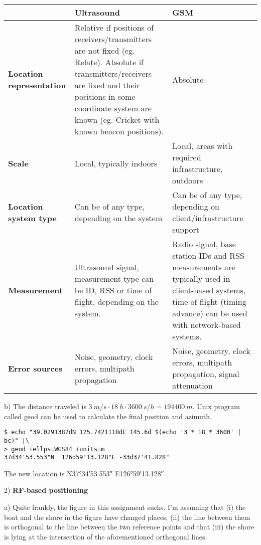 \documentclass[a4paper,parskip=full]{scrartcl}
\begin{document}
\begin{tabularx}{\textwidth}{ | >{\raggedright\arraybackslash}p{14ex} | >{\raggedright\arraybackslash}X | >{\raggedright\arraybackslash}X | }
  \hline
  & \textbf{Ultrasound} & \textbf{GSM} \\ \hline
  \textbf{Location representation} &
    Relative if positions of receivers/transmitters are not fixed (eg.
    Relate). Absolute if transmitters/receivers are fixed and their positions in
    some coordinate system are known (eg. Cricket with known beacon positions).
    &
    Absolute \\ \hline
  \textbf{Scale} & Local, typically indoors & Local, areas with required
    infrastructure, outdoors \\ \hline
  \textbf{Location system type} & Can be of any type, depending on the system
    & Can be of any type, depending on client/infrastructure support \\ \hline
  \textbf{Measurement} & Ultrasound signal, measurement type can be
    ID, RSS or time of flight, depending on the system. & Radio signal,
      base station IDs and RSS-measurements are typically used in
      client-based systems, time of flight (timing advance) can be used with
      network-based systems. \\ \hline
  \textbf{Error sources} & Noise, geometry, clock errors, multipath propagation
    & Noise, geometry, clock errors, multipath propagation, signal
      attenuation \\ \hline
\end{tabularx}

b) The distance traveled is $\SI{3}{m/s} \cdot \SI{18}{h} \cdot \SI{3600}{s/h}
= \SI{194400}{m}$. Unix program called geod can be used to calculate the
final position and azimuth.
\begin{verbatim}
$ echo "39.0291382dN 125.7421118dE 145.6d $(echo '3 * 18 * 3600' | bc)" |\
> geod +ellps=WGS84 +units=m
37d34'53.553"N  126d59'13.128"E -33d37'41.828"
\end{verbatim}
The new location is N\ang{37;34;53.553} E\ang{126;59;13.128}.

2) \textbf{RF-based positioning}

a) Quite frankly, the figure in this assignment sucks. I'm assuming that (i) the
boat and the shore in the figure have changed places, (ii) the line between them
is orthogonal to the line between the two reference points and that (iii)
the shore is lying at the intersection of the aforementioned orthogonal lines.
\end{document}
